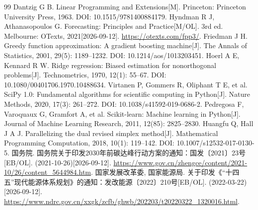 \begin{thebibliography}{99}
 Dantzig G B. Linear Programming and Extensions[M]. Princeton: Princeton University Press, 1963. DOI: 10.1515/9781400884179.
 Hyndman R J, Athanasopoulos G. Forecasting: Principles and Practice[M/OL]. 3rd ed. Melbourne: OTexts, 2021[2026-09-12]. \url{https://otexts.com/fpp3/}.
 Friedman J H. Greedy function approximation: A gradient boosting machine[J]. The Annals of Statistics, 2001, 29(5): 1189--1232. DOI: 10.1214/aos/1013203451.
 Hoerl A E, Kennard R W. Ridge regression: Biased estimation for nonorthogonal problems[J]. Technometrics, 1970, 12(1): 55--67. DOI: 10.1080/00401706.1970.10488634.
 Virtanen P, Gommers R, Oliphant T E, et al. SciPy 1.0: Fundamental algorithms for scientific computing in Python[J]. Nature Methods, 2020, 17(3): 261--272. DOI: 10.1038/s41592-019-0686-2.
 Pedregosa F, Varoquaux G, Gramfort A, et al. Scikit-learn: Machine learning in Python[J]. Journal of Machine Learning Research, 2011, 12(85): 2825--2830.
 Huangfu Q, Hall J A J. Parallelizing the dual revised simplex method[J]. Mathematical Programming Computation, 2018, 10(1): 119--142. DOI: 10.1007/s12532-017-0130-5.
 国务院. 国务院关于印发2030年前碳达峰行动方案的通知：国发〔2021〕23号[EB/OL]. (2021-10-26)[2026-09-12]. \url{https://www.gov.cn/zhengce/content/2021-10/26/content_5644984.htm}.
 国家发展改革委, 国家能源局. 关于印发《“十四五”现代能源体系规划》的通知：发改能源〔2022〕210号[EB/OL]. (2022-03-22)[2026-09-12]. \url{https://www.ndrc.gov.cn/xxgk/zcfb/ghwb/202203/t20220322_1320016.html}.
\end{thebibliography}
